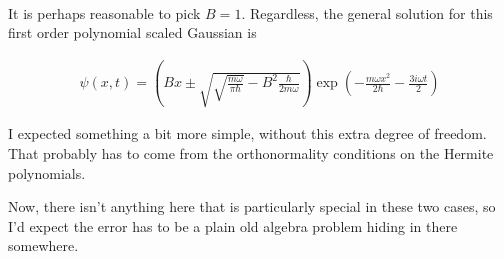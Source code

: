 \documentclass{article}
\begin{document}
\begin{align*}
\end{align*}

It is perhaps reasonable to pick $B=1$.  Regardless, the general solution for this first order polynomial scaled Gaussian is

\begin{align*}
\psi(x,t) = 
\left(B x \pm \sqrt{\sqrt{\frac{m \omega}{\pi \hbar}} - B^2 \frac{ \hbar}{ 2 m \omega} }\right) \exp\left( - \frac{m \omega x^2}{2 \hbar} - \frac{3 i \omega t }{ 2} \right)
\end{align*}

I expected something a bit more simple, without this extra degree of freedom.  That probably has to come from the orthonormality conditions on the
Hermite polynomials.

Now, there isn't anything here that is particularly special in these two cases, so I'd expect the error has to be a plain old algebra problem 
hiding in there somewhere.



\end{document}
